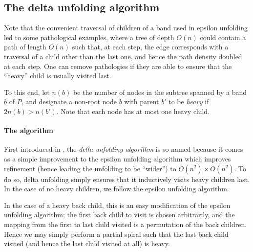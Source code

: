 \documentclass{article}
\begin{document}
\subsection{The delta unfolding algorithm}\label{Nonlinear delta subsection}
Note that the convenient traversal of children of a band used in epsilon unfolding led to some pathological examples, where a tree of depth $O(n)$ could contain a path of length $O(n)$ such that, at each step, the edge corresponds with a traversal of a child other than the last one, and hence the path density doubled at each step.
One can remove pathologies if they are able to ensure that the ``heavy'' child is usually visited last.

To this end, let $n(b)$ be the number of nodes in the subtree spanned by a band $b$ of $P$, and designate a non-root node $b$ with parent $b'$ to be \emph{heavy} if $2n(b) > n(b')$.
Note that each node has at most one heavy child.

\paragraph{The algorithm}
First introduced in \cite{Damian_Demaine_Flatland}, the \emph{delta unfolding algorithm} is so-named because it comes as a simple improvement to the epsilon unfolding algorithm which improves refinement (hence leading the unfolding to be ``wider'') to $O(n^2) \times O(n^2)$.
To do so, delta unfolding simply ensures that it inductively visits heavy children last.
In the case of no heavy children, we follow the epsilon unfolding algorithm.

In the case of a heavy back child, this is an easy modification of the epsilon unfolding algorithm;
the first back child to visit is chosen arbitrarily, and the mapping from the first to last child visited is a permutation of the back children.
Hence we may simply perform a partial spiral such that the last back child visited (and hence the last child visited at all) is heavy.
\end{document}
